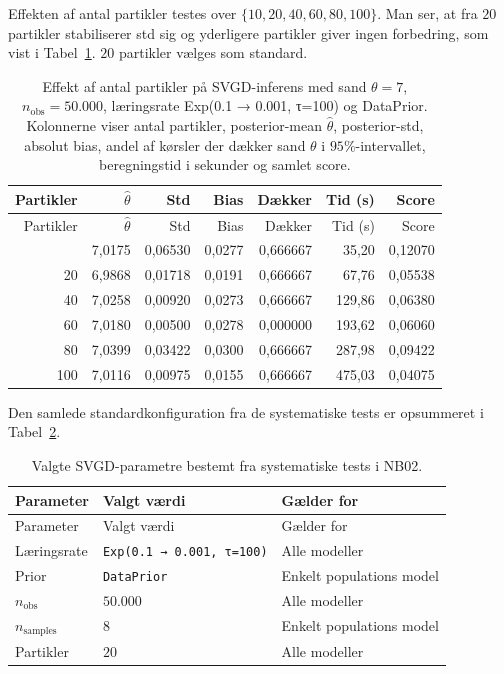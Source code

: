 \documentclass[
  10pt,
  a4paper,
]{scrbook}
\begin{document}
Effekten af antal partikler testes over \(\{10, 20, 40, 60, 80, 100\}\).
Man ser, at fra \(20\) partikler stabiliserer std sig og yderligere
partikler giver ingen forbedring, som vist i Tabel~\ref{tbl-partikler}.
\(20\) partikler vælges som standard.

\begin{longtable}[]{@{}rrrrrrr@{}}
\caption{Effekt af antal partikler på SVGD-inferens med sand
\(\theta = 7\), \(n_{\text{obs}} = 50.000\), læringsrate Exp(0.1 →
0.001, τ=100) og DataPrior. Kolonnerne viser antal partikler,
posterior-mean \(\hat\theta\), posterior-std, absolut bias, andel af
kørsler der dækker sand \(\theta\) i \(95\%\)-intervallet, beregningstid
i sekunder og samlet score.}\label{tbl-partikler}\tabularnewline
\toprule\noalign{}
Partikler & \(\hat\theta\) & Std & Bias & Dækker & Tid (s) & Score \\
\midrule\noalign{}
\endfirsthead
\toprule\noalign{}
Partikler & \(\hat\theta\) & Std & Bias & Dækker & Tid (s) & Score \\
\midrule\noalign{}
\endhead
\bottomrule\noalign{}
\endlastfoot
10 & 7,0175 & 0,06530 & 0,0277 & 0,666667 & 35,20 & 0,12070 \\
20 & 6,9868 & 0,01718 & 0,0191 & 0,666667 & 67,76 & 0,05538 \\
40 & 7,0258 & 0,00920 & 0,0273 & 0,666667 & 129,86 & 0,06380 \\
60 & 7,0180 & 0,00500 & 0,0278 & 0,000000 & 193,62 & 0,06060 \\
80 & 7,0399 & 0,03422 & 0,0300 & 0,666667 & 287,98 & 0,09422 \\
100 & 7,0116 & 0,00975 & 0,0155 & 0,666667 & 475,03 & 0,04075 \\
\end{longtable}

Den samlede standardkonfiguration fra de systematiske tests er
opsummeret i Tabel~\ref{tbl-standard-config}.

\begin{longtable}[]{@{}lll@{}}
\caption{Valgte SVGD-parametre bestemt fra systematiske tests i
NB02.}\label{tbl-standard-config}\tabularnewline
\toprule\noalign{}
Parameter & Valgt værdi & Gælder for \\
\midrule\noalign{}
\endfirsthead
\toprule\noalign{}
Parameter & Valgt værdi & Gælder for \\
\midrule\noalign{}
\endhead
\bottomrule\noalign{}
\endlastfoot
Læringsrate & \texttt{Exp(0.1\ →\ 0.001,\ τ=100)} & Alle modeller \\
Prior & \texttt{DataPrior} & Enkelt populations model \\
\(n_{\text{obs}}\) & \(50.000\) & Alle modeller \\
\(n_{\text{samples}}\) & \(8\) & Enkelt populations model \\
Partikler & \(20\) & Alle modeller \\
\end{longtable}
\end{document}
